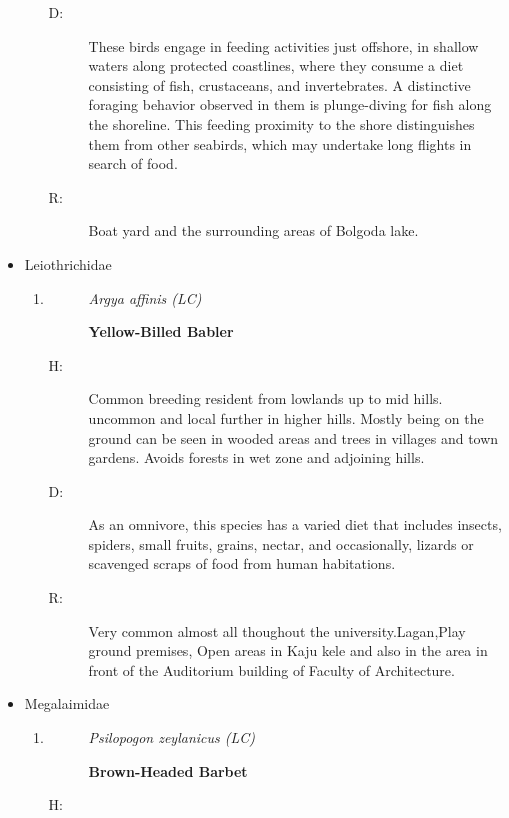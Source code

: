 \begin{itemize}
\begin{enumerate}
\begin{description}
\item[D: ]%
These birds engage in feeding activities just offshore, in shallow waters along protected coastlines, where they consume a diet consisting of fish, crustaceans, and invertebrates. A distinctive foraging behavior observed in them is plunge{-}diving for fish along the shoreline. This feeding proximity to the shore distinguishes them from other seabirds, which may undertake long flights in search of food.%
\item[R: ]%
Boat yard and the surrounding areas of Bolgoda lake.%
\end{description}%
\end{enumerate}%
\item%
Leiothrichidae%
\begin{enumerate}%
\item%
\begin{description}%
\item[]%
\textit{Argya affinis (LC)}%
\item[]%
\textbf{Yellow{-}Billed Babler}%
\end{description}%
\begin{description}%
\item[H: ]%
Common breeding resident from lowlands up to mid hills. uncommon and local further in higher hills. Mostly being on the ground can be seen in wooded areas and trees in villages and town gardens. Avoids forests in wet zone and adjoining hills. %
\item[D: ]%
As an omnivore, this species has a varied diet that includes insects, spiders, small fruits, grains, nectar, and occasionally, lizards or scavenged scraps of food from human habitations.%
\item[R: ]%
Very common almost all thoughout the university.Lagan,Play ground premises, Open areas in Kaju kele and also in the area in front of the Auditorium building of Faculty of Architecture.%
\end{description}%
\end{enumerate}%
\item%
Megalaimidae%
\begin{enumerate}%
\item%
\begin{description}%
\item[]%
\textit{Psilopogon zeylanicus (LC)}%
\item[]%
\textbf{Brown{-}Headed Barbet}%
\end{description}%
\begin{description}%
\item[H: ]%

\end{description}
\end{enumerate}
\end{itemize}
